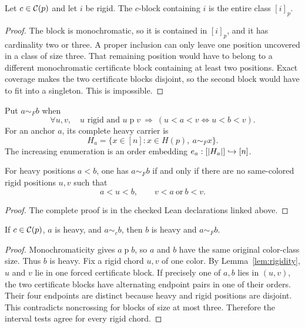\begin{lemma}\label{lem:rigidity}
Let $c\in\mathcal C(p)$ and let $i$ be rigid. The $c$-block containing $i$ is
the entire class $[i]_p$.
\leanok
{}
\end{lemma}
\begin{proof}
The block is monochromatic, so it is contained in $[i]_p$, and it has
cardinality two or three. A proper inclusion can only leave one position
uncovered in a class of size three. That remaining position would have to
belong to a different monochromatic certificate block containing at least two
positions. Exact coverage makes the two certificate blocks disjoint, so the
second block would have to fit into a singleton. This is impossible.
\leanok
{}
\end{proof}

\begin{definition}\label{def:face}
Put $a\sim_F b$ when
\begin{equation}\label{eq:face_signature}
 \forall u,v,\quad
 u\text{ rigid and }u\mathrel p v
 \ \Longrightarrow\
 (u<a<v\Longleftrightarrow u<b<v).
\end{equation}
For an anchor $a$, its complete heavy carrier is
\[
 H_a=\{x\in[n]:x\in H(p),\ a\sim_F x\}.
\]
The increasing enumeration is an order embedding
$e_a:[\lvert H_a\rvert]\hookrightarrow[n]$.
\leanok
{}
\end{definition}

\begin{lemma}[Arc criterion]\label{lem:arc}
For heavy positions $a<b$, one has $a\sim_F b$ if and only if there are no
same-colored rigid positions $u,v$ such that
\[
 a<u<b,\qquad v<a\ \text{or}\ b<v.
\]
\leanok
{}
\end{lemma}
\begin{proof}\leanok
The complete proof is in the checked Lean declarations linked above.
\end{proof}


\begin{theorem}[Heavy-block confinement]\label{thm:confinement}
If $c\in\mathcal C(p)$, $a$ is heavy, and $a\sim_c b$, then $b$ is heavy and
$a\sim_F b$.
\leanok
{}
\end{theorem}
\begin{proof}
Monochromaticity gives $a\mathrel p b$, so $a$ and $b$ have the same original
color-class size. Thus $b$ is heavy. Fix a rigid chord $u,v$ of one color.
By Lemma~\ref{lem:rigidity}, $u$ and $v$ lie in one forced certificate block.
If precisely one of $a,b$ lies in $(u,v)$, the two certificate blocks have
alternating endpoint pairs in one of their orders. Their four endpoints are
distinct because heavy and rigid positions are disjoint. This contradicts
noncrossing for blocks of size at most three. Therefore the interval tests
agree for every rigid chord.
\leanok
{}
\end{proof}

